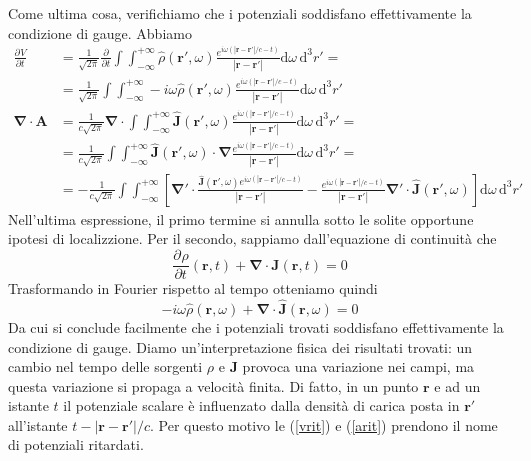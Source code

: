 \documentclass[a4paper,11pt]{book}
\newcommand{\dif}{\mathrm{d}}
\newcommand{\der}[3][]{\frac{\partial ^{#1}#2}{\partial {#3}^{#1}}}
\let\oldnabla\nabla
\renewcommand{\nabla}{\vec{\oldnabla}}
\renewcommand{\vec}[1]{\mathbf{#1}}
\theoremstyle{theorem}
\theoremstyle{definition}
\begin{document}
Come ultima cosa, verifichiamo che i potenziali soddisfano effettivamente la condizione di gauge. Abbiamo
\begin{align*}\der{V}{t}&=\frac{1}{\sqrt{2\pi}}\der{}{t}\int\int_{-\infty}^{+\infty}\hat{\rho}(\vec{r}',\omega)\frac{e^{i\omega(|\vec{r}-\vec{r}'|/c-t)}}{|\vec{r}-\vec{r}'|}\dif\omega\,\dif^3r'=\\&=\frac{1}{\sqrt{2\pi}}\int\int_{-\infty}^{+\infty}-i\omega\hat{\rho}(\vec{r}',\omega)\frac{e^{i\omega(|\vec{r}-\vec{r}'|/c-t)}}{|\vec{r}-\vec{r}'|}\dif\omega\,\dif^3r'\\\nabla\cdot\vec{A}&=\frac{1}{c\sqrt{2\pi}}\nabla\cdot\int\int_{-\infty}^{+\infty}\hat{\vec{J}}(\vec{r}',\omega)\frac{e^{i\omega(|\vec{r}-\vec{r}'|/c-t)}}{|\vec{r}-\vec{r}'|}\dif\omega\,\dif^3r'=\\&=\frac{1}{c\sqrt{2\pi}}\int\int_{-\infty}^{+\infty}\hat{\vec{J}}(\vec{r}',\omega)\cdot\nabla\frac{e^{i\omega(|\vec{r}-\vec{r}'|/c-t)}}{|\vec{r}-\vec{r}'|}\dif\omega\,\dif^3r'=\\&=-\frac{1}{c\sqrt{2\pi}}\int\int_{-\infty}^{+\infty}\left[\nabla'\cdot\frac{\hat{\vec{J}}(\vec{r}',\omega)e^{i\omega(|\vec{r}-\vec{r}'|/c-t)}}{|\vec{r}-\vec{r}'|}-\frac{e^{i\omega(|\vec{r}-\vec{r}'|/c-t)}}{|\vec{r}-\vec{r}'|}\nabla'\cdot\hat{\vec{\vec{J}}}(\vec{r}',\omega)\right]\dif\omega\,\dif^3r'\end{align*}
Nell'ultima espressione, il primo termine si annulla sotto le solite opportune ipotesi di localizzione. Per il secondo, sappiamo dall'equazione di continuità che
\[\der{\rho}{t}(\vec{r},t)+\nabla\cdot\vec{J}(\vec{r},t)=0\]
Trasformando in Fourier rispetto al tempo otteniamo quindi
\begin{equation}\label{continuitafourier}-i\omega\hat{\rho}(\vec{r},\omega)+\nabla\cdot\hat{\vec{J}}(\vec{r},\omega)=0\end{equation}
Da cui si conclude facilmente che i potenziali trovati soddisfano effettivamente la condizione di gauge.
Diamo un'interpretazione fisica dei risultati trovati: un cambio nel tempo delle sorgenti $\rho$ e $\vec{J}$ provoca una variazione nei campi, ma questa variazione si propaga a velocità finita. Di fatto, in un punto $\vec{r}$ e ad un istante $t$ il potenziale scalare è influenzato dalla densità di carica posta in $\vec{r}'$ all'istante $t-|\vec{r}-\vec{r}'|/c$. Per questo motivo le (\ref{vrit}) e (\ref{arit}) prendono il nome di potenziali ritardati.
\end{document}
